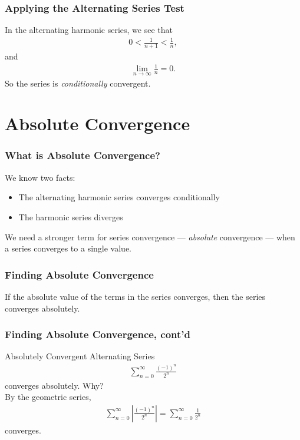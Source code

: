 \documentclass{beamer}
\begin{document}
\begin{frame}
  \frametitle{Applying the Alternating Series Test}
   In the alternating harmonic series, we see that\pause
      \begin{align*}
        0 < \frac{1}{n+1} < \frac{1}{n},
      \end{align*}\pause
      and
      \begin{align*}
        \lim_{n\rightarrow\infty}\frac{1}{n} = 0.
      \end{align*} \pause
      So the series is \textit{conditionally} convergent.
\end{frame}
\section{Absolute Convergence}
\begin{frame}
  \frametitle{What is Absolute Convergence?}
  We know two facts: \pause
  \begin{itemize}
    \item<1-> The alternating harmonic series converges conditionally
    \item<2-> The harmonic series diverges
  \end{itemize}\pause
  We need a stronger term for series convergence --- \textit{absolute} convergence --- when a series converges to a single value.
\end{frame}
\begin{frame}
  \frametitle{Finding Absolute Convergence}
  If the absolute value of the terms in the series converges, then the series converges absolutely.\pause\\
\end{frame}
\begin{frame}
  \frametitle{Finding Absolute Convergence, cont'd}
  \begin{block}{Absolutely Convergent Alternating Series}
    \begin{align*}
      \sum_{n=0}^{\infty}\frac{(-1)^{n}}{2^n}
    \end{align*}
    converges absolutely. Why?\pause\\

    By the geometric series,
    \begin{align*}
      \sum_{n=0}^{\infty}\left|\frac{(-1)^{n}}{2^n}\right| = \sum_{n=0}^{\infty}\frac{1}{2^n}
    \end{align*}
    converges.
  \end{block}
\end{frame}
\end{document}

